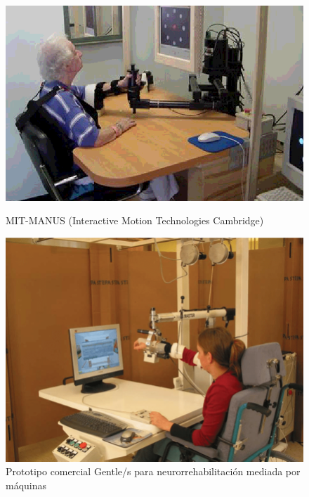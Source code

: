 \begin{figure}[ht!]
	\centering
	\begin{minipage}{0.55\linewidth}
		\centering
		\includegraphics[width=\linewidth]{figs/mit_manus.png}
	\end{minipage}
	\caption[MIT-MANUS (Interactive Motion Technologies Cambridge)]{MIT-MANUS (Interactive Motion Technologies Cambridge)}
	\label{fig:mitmanus}

	\centering
	\begin{minipage}{0.55\linewidth}
		\centering
		\includegraphics[width=\linewidth]{figs/gentles.png}
	\end{minipage}
	\caption[Prototipo comercial Gentle/s para neurorrehabilitación mediada por máquinas]{Prototipo comercial Gentle/s para neurorrehabilitación mediada por máquinas}
	\label{fig:gentles}
\end{figure}


